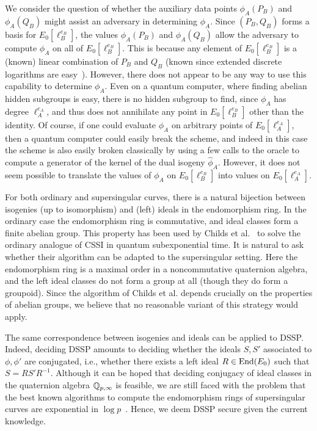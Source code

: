 We consider the question of whether the auxiliary data points
$\phi_A(P_B)$ and $\phi_A(Q_B)$ might assist an adversary in
determining $\phi_A$. Since $(P_B,Q_B)$ forms a basis for
$E_0[\ell_B^{e_B}]$, the values $\phi_A(P_B)$ and $\phi_A(Q_B)$ allow
the adversary to compute $\phi_A$ on all of $E_0[\ell_B^{e_B}]$. This
is because any element of $E_0[\ell_B^{e_B}]$ is a (known) linear
combination of $P_B$ and $Q_B$ (known since extended discrete
logarithms are easy~\cite{teske-ph}). However, there does not appear
to be any way to use this capability to determine $\phi_A$. Even on a
quantum computer, where finding abelian hidden subgroups is easy,
there is no hidden subgroup to find, since $\phi_A$ has degree
$\ell_A^{e_A}$, and thus does not annihilate any point in
$E_0[\ell_B^{e_B}]$ other than the identity. Of course, if one could
evaluate $\phi_A$ on arbitrary points of $E_0[\ell_A^{e_A}]$, then a
quantum computer could easily break the scheme, and indeed in this case the
scheme is also easily broken classically by using a few calls to the
oracle to compute a generator of the kernel of the dual isogeny 
$\hat{\phi}_A$. However, it does not seem possible to translate the values of
$\phi_A$ on $E_0[\ell_B^{e_B}]$ into values on $E_0[\ell_A^{e_A}]$.

For both ordinary and supersingular curves, there is a natural
bijection between isogenies (up to isomorphism) and (left) ideals in
the endomorphism ring. In the ordinary case the endomorphism ring is
commutative, and ideal classes form a finite abelian group. This
property has been used by Childs et al.~\cite{CJS} to solve the
ordinary analogue of CSSI in quantum subexponential time. It is
natural to ask whether their algorithm can be adapted to the
supersingular setting. Here the
endomorphism ring is a maximal order in a noncommutative quaternion
algebra, and the left ideal classes do not form a group at all (though
they do
form a groupoid). Since the algorithm of Childs et al. depends
crucially on the properties of abelian groups, we believe that no
reasonable variant of this strategy would apply.

The same correspondence between isogenies and ideals can be applied to
DSSP. Indeed, deciding DSSP amounts to deciding whether the ideals
$S,S'$ associated to $\phi,\phi'$ are conjugated, i.e., whether there
exists a left ideal $R\in\operatorname{End}(E_0)$ such that $S=RS'R^{-1}$. Although
it can be hoped that deciding conjugacy of ideal classes in the
quaternion algebra ${\mathbb{Q}}_{p,\infty}$ is feasible, we are still faced
with the problem that the best known algorithms to compute the
endomorphism rings of supersingular curves are exponential in $\log
p$~\cite{Kohel,cervino04,belding08-thesis}. Hence, we deem DSSP secure
given the current knowledge.

